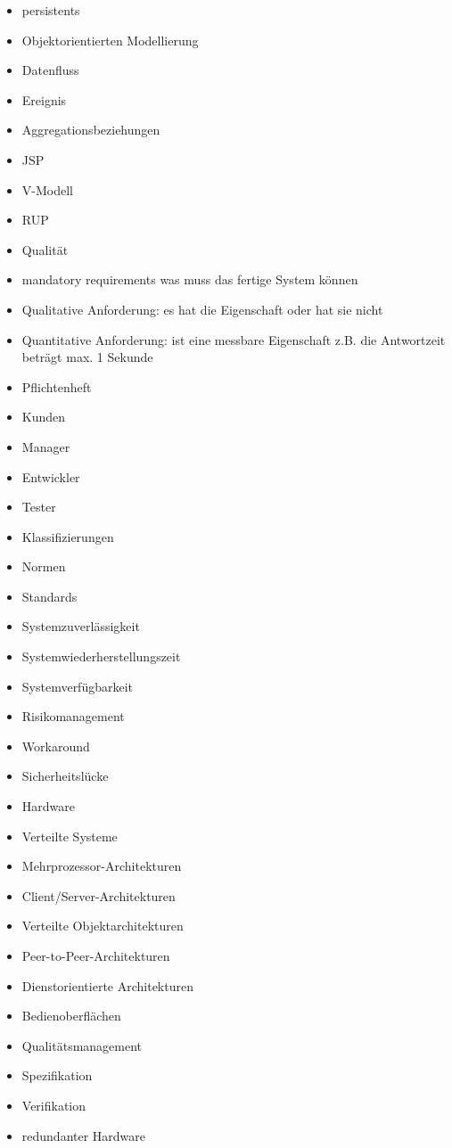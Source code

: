 \begin{itemize}
\item persistents
\item Objektorientierten Modellierung
\item Datenfluss
\item Ereignis
\item Aggregationsbeziehungen
\item JSP
\item V-Modell
\item RUP
\item Qualität
\item mandatory requirements was muss das fertige System können
\item Qualitative Anforderung: es hat die Eigenschaft oder hat sie nicht
\item Quantitative Anforderung: ist eine messbare Eigenschaft z.B. die Antwortzeit beträgt max. 1 Sekunde
\item Pflichtenheft
\item Kunden
\item Manager
\item Entwickler
\item Tester
\item Klassifizierungen
\item Normen
\item Standards
\item Systemzuverlässigkeit
\item Systemwiederherstellungszeit
\item Systemverfügbarkeit
\item Risikomanagement
\item Workaround
\item Sicherheitslücke
\item Hardware
\item Verteilte Systeme
\item Mehrprozessor-Architekturen
\item Client/Server-Architekturen
\item Verteilte Objektarchitekturen
\item Peer-to-Peer-Architekturen
\item Dienstorientierte Architekturen
\item Bedienoberflächen
\item Qualitätsmanagement
\item Spezifikation
\item Verifikation
\item redundanter Hardware
\end{itemize}